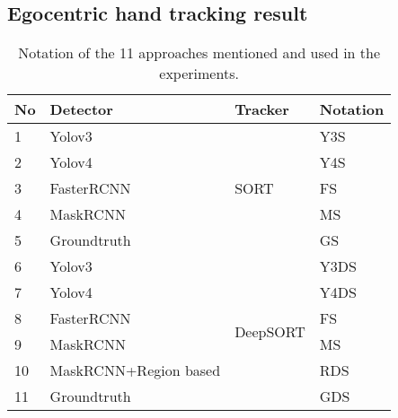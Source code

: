 \subsection{Egocentric hand tracking result}
\begin{table}[]
	\centering
	\label{tab:notation}
	\begin{tabular}{|l|l|l|l|}
		\hline
		No & Detector              & Tracker                                        & Notation \\ \hline
		1  & Yolov3                & \multirow{5}{*}{SORT}                          & Y3S      \\ \cline{1-2} \cline{4-4} 
		2  & Yolov4                &                                                & Y4S      \\ \cline{1-2} \cline{4-4} 
		3  & FasterRCNN            &                                                & FS       \\ \cline{1-2} \cline{4-4} 
		4  & MaskRCNN              &                                                & MS       \\ \cline{1-2} \cline{4-4} 
		5  & Groundtruth           &                                                & GS       \\ \hline
		6  & Yolov3                & \multicolumn{1}{c|}{\multirow{6}{*}{DeepSORT}} & Y3DS     \\ \cline{1-2} \cline{4-4} 
		7  & Yolov4                & \multicolumn{1}{c|}{}                          & Y4DS     \\ \cline{1-2} \cline{4-4} 
		8  & FasterRCNN            & \multicolumn{1}{c|}{}                          & FS       \\ \cline{1-2} \cline{4-4} 
		9  & MaskRCNN              & \multicolumn{1}{c|}{}                          & MS       \\ \cline{1-2} \cline{4-4} 
		10 & MaskRCNN+Region based & \multicolumn{1}{c|}{}                          & RDS      \\ \cline{1-2} \cline{4-4} 
		11 & Groundtruth           & \multicolumn{1}{c|}{}                          & GDS      \\ \hline
	\end{tabular}
	\caption{Notation of the 11 approaches mentioned and used in the experiments.}
	\vspace{-2cm}
\end{table}
